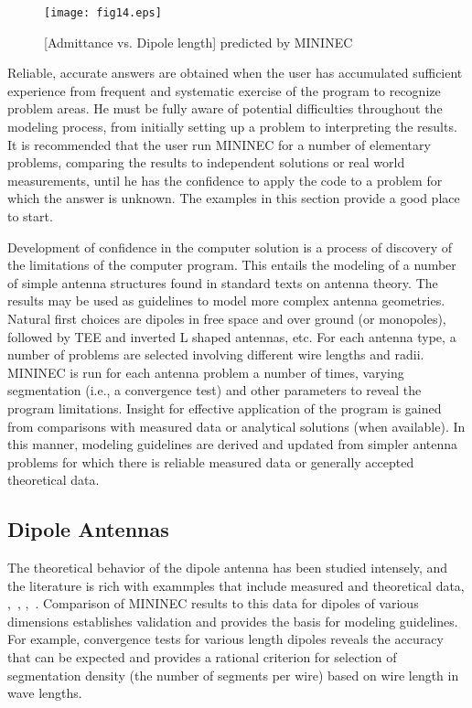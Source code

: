 \documentclass[12pt]{article}
\begin{document}
\begin{sidewaysfigure}[htb]
\centerline{\texttt{[image: fig14.eps]}}
\caption{[Admittance vs. Dipole length] predicted by MININEC}
\label{fig14}
\end{sidewaysfigure}
\afterpage\clearpage

Reliable, accurate answers are obtained when the user has accumulated
sufficient experience from frequent and systematic exercise of the
program to recognize problem areas. He must be fully aware of potential
difficulties throughout the modeling process, from initially setting up
a problem to interpreting the results. It is recommended that the user
run MININEC for a number of elementary problems, comparing the results
to independent solutions or real world measurements, until he has the
confidence to apply the code to a problem for which the answer is
unknown. The examples in this section provide a good place to start.

Development of confidence in the computer solution is a process of
discovery of the limitations of the computer program. This entails the
modeling of a number of simple antenna structures found in standard
texts on antenna theory. The results may be used as guidelines to model
more complex antenna geometries. Natural first choices are dipoles in
free space and over ground (or monopoles), followed by TEE and inverted
L shaped antennas, etc. For each antenna type, a number of problems are
selected involving different wire lengths and radii. MININEC is run for
each antenna problem a number of times, varying segmentation (i.e., a
convergence test) and other parameters to reveal the program
limitations. Insight for effective application of the program is gained
from comparisons with measured data or analytical solutions (when
available). In this manner, modeling guidelines are derived and updated
from simpler antenna problems for which there is reliable measured data
or generally accepted theoretical data.

\subsection{Dipole Antennas}
The theoretical behavior of the dipole antenna has been studied
intensely, and the literature is rich with exammples that include
measured and theoretical data, \cite{r8},~\cite{r9},
\cite{r15},~\cite{r16}. Comparison of MININEC results to this data for
dipoles of various dimensions establishes validation and provides the
basis for modeling guidelines. For example, convergence tests for
various length dipoles reveals the accuracy that can be expected and
provides a rational criterion for selection of segmentation density (the
number of segments per wire) based on wire length in wave lengths.
\end{document}
